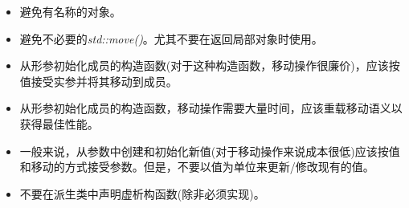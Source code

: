 \begin{itemize}
	\item 避免有名称的对象。
	\item 避免不必要的\textit{std::move()}。尤其不要在返回局部对象时使用。
	\item 从形参初始化成员的构造函数(对于这种构造函数，移动操作很廉价)，应该按值接受实参并将其移动到成员。
	\item 从形参初始化成员的构造函数，移动操作需要大量时间，应该重载移动语义以获得最佳性能。
	\item 一般来说，从参数中创建和初始化新值(对于移动操作来说成本很低)应该按值和移动的方式接受参数。但是，不要以值为单位来更新/修改现有的值。
	\item 不要在派生类中声明虚析构函数(除非必须实现)。
\end{itemize}


\newpage